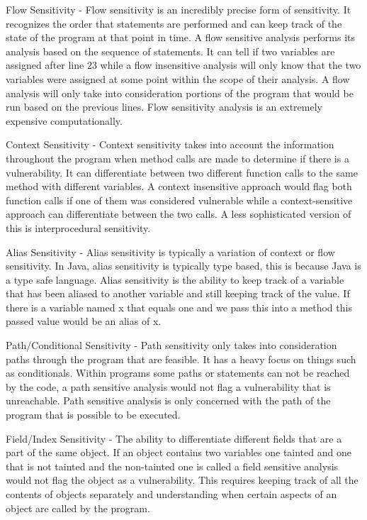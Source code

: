 Flow Sensitivity - Flow sensitivity is an incredibly precise form of sensitivity. It recognizes the order that statements are performed and can keep track of the state of the program at that point in time. A flow sensitive analysis performs its analysis based on the sequence of statements. It can tell if two variables are assigned after line 23 while a flow insensitive analysis will only know that the two variables were assigned at some point within the scope of their analysis. A flow analysis will only take into consideration portions of the program that would be run based on the previous lines. Flow sensitivity analysis is an extremely expensive computationally.

Context Sensitivity - Context sensitivity takes into account the information throughout the program when method calls are made to determine if there is a vulnerability. It can differentiate between two different function calls to the same method with different variables. A context insensitive approach would flag both function calls if one of them was considered vulnerable while a context-sensitive approach can differentiate between the two calls. A less sophisticated version of this is interprocedural sensitivity.

Alias Sensitivity - Alias sensitivity is typically a variation of context or flow sensitivity. In Java, alias sensitivity is typically type based, this is because Java is a type safe language. Alias sensitivity is the ability to keep track of a variable that has been aliased to another variable and still keeping track of the value. If there is a variable named x that equals one and we pass this into a method this passed value would be an alias of x.

Path/Conditional Sensitivity - Path sensitivity only takes into consideration paths through the program that are feasible. It has a heavy focus on things such as conditionals. Within programs some paths or statements can not be reached by the code, a path sensitive analysis would not flag a vulnerability that is unreachable. Path sensitive analysis is only concerned with the path of the program that is possible to be executed.

Field/Index Sensitivity - The ability to differentiate different fields that are a part of the same object. If an object contains two variables one tainted and one that is not tainted and the non-tainted one is called a field sensitive analysis would not flag the object as a vulnerability. This requires keeping track of all the contents of objects separately and understanding when certain aspects of an object are called by the program.
    

